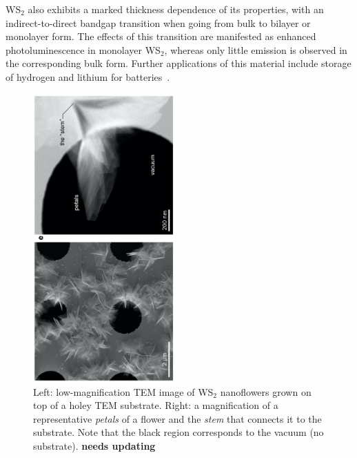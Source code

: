 WS$_2$ also exhibits a marked thickness dependence of
its properties, with an indirect-to-direct bandgap transition when going
from bulk to bilayer or monolayer form.
%
The effects of this transition are manifested as enhanced
photoluminescence in monolayer WS$_2$, whereas only little emission is observed in
the corresponding bulk form.
%
Further applications of this material include storage of hydrogen 
and lithium for batteries~\cite{Bhandavat:2012}.

\begin{figure}[t]
    \centering
    \includegraphics[width=0.49\textwidth,angle=-90]{plots/nanoflowers.pdf}
    \caption{Left: low-magnification TEM image of WS$_2$ nanoflowers
      grown on top of a holey TEM substrate. Right: a magnification of a
      representative {\it petals}
      of a flower and the {\it stem} that connects it to the substrate.
      Note that the black region corresponds to the vacuum (no substrate).
      {\bf needs updating}
      }
    \label{fig:nanoflowers}
\end{figure}

